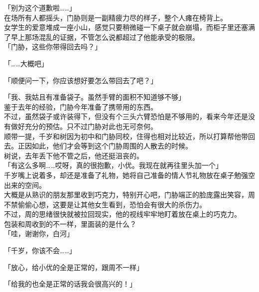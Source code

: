 「别为这个道歉啦……」\\

在场所有人都摇头，门胁则是一副精疲力尽的样子，整个人瘫在椅背上。\\

女学生的爱意堆成一座小山，感觉只要稍微碰一下桌子就会崩塌，而柜子里还塞满了早上那场混乱的证据，不管怎么说都超过了他能承受的极限。\\

「门胁，这些你带得回去吗？」

「……大概吧」

「顺便问一下，你应该想好要怎么带回去了吧？」

「我、我姑且有准备袋子。虽然手臂的面积不知道够不够」\\

鉴于去年的经验，门胁今年准备了携带用的东西。\\

不过，虽然袋子或许装得下，但没有个三头六臂恐怕是不够用的，看来今年还是没有做好充分的预估。只不过门胁对此也无可奈何。\\

顺带一提，千岁和树因为初中和门胁同校，住得也相对比较近，所以打算帮他带回去。正因如此，他们才会等到这个门胁周围的人散去的时候。\\

树说，去年丢下他不管之后，他还挺沮丧的。\\

「有这么多啊……哎呀，真的很抱歉，小优。我现在就再往里头加一个」\\

千岁嘴上说着多，却还是准备了礼物，她将自己准备的情人节礼物放在桌子勉强空出来的空间。\\

大概是从熟识的朋友那里收到巧克力，特别开心吧，门胁端正的脸庞露出笑容，周不禁偷偷心想，这要是让其他女生看到，恐怕会有很大的杀伤力。\\

不过，周的思绪很快就被拉回现实，他的视线牢牢地盯着放在桌上的巧克力。\\

包装和周收到的不一样，里面装的是什么？\\

「哇，谢谢你，白河」

「千岁，你该不会……」

「放心，给小优的全是正常的，跟周不一样」

「给我的也全是正常的话我会很高兴的！」\\

